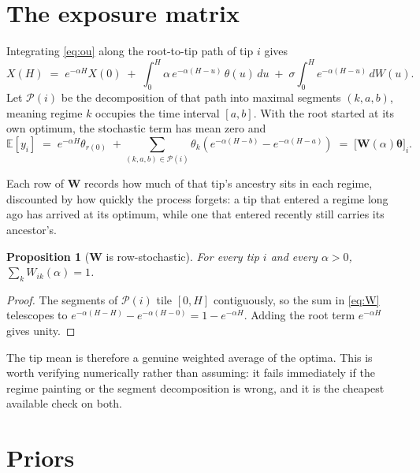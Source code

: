 \documentclass[11pt]{article}
\newtheorem{proposition}{Proposition}
\newcommand{\Wm}{\mathbf{W}}
\newcommand{\thetav}{\boldsymbol{\theta}}
\newcommand{\E}{\mathbb{E}}
\begin{document}
\section{The exposure matrix}

Integrating \eqref{eq:ou} along the root-to-tip path of tip $i$ gives
\begin{equation}
X(H) \;=\; e^{-\alpha H} X(0) \;+\; \int_{0}^{H}\!\alpha\, e^{-\alpha(H-u)}\,\theta(u)\,du
   \;+\; \sigma\!\int_{0}^{H}\! e^{-\alpha(H-u)}\,dW(u).
\end{equation}
Let $\mathcal{P}(i)$ be the decomposition of that path into maximal segments $(k, a, b)$, meaning
regime $k$ occupies the time interval $[a,b]$. With the root started at its own optimum, the
stochastic term has mean zero and
\begin{equation}
\E[y_i] \;=\; e^{-\alpha H}\theta_{r(0)}
   \;+\!\! \sum_{(k,a,b) \in \mathcal{P}(i)}\!\! \theta_{k}\left(e^{-\alpha(H-b)} - e^{-\alpha(H-a)}\right)
   \;=\; \bigl[\Wm(\alpha)\thetav\bigr]_{i}.
\label{eq:W}
\end{equation}

Each row of $\Wm$ records how much of that tip's ancestry sits in each regime, discounted by how
quickly the process forgets: a tip that entered a regime long ago has arrived at its optimum, while
one that entered recently still carries its ancestor's.

\begin{proposition}[$\Wm$ is row-stochastic]
For every tip $i$ and every $\alpha > 0$, $\sum_{k} W_{ik}(\alpha) = 1$.
\end{proposition}
\begin{proof}
The segments of $\mathcal{P}(i)$ tile $[0,H]$ contiguously, so the sum in \eqref{eq:W} telescopes to
$e^{-\alpha(H-H)} - e^{-\alpha(H-0)} = 1 - e^{-\alpha H}$. Adding the root term $e^{-\alpha H}$ gives
unity.
\end{proof}

\noindent
The tip mean is therefore a genuine weighted average of the optima. This is worth verifying
numerically rather than assuming: it fails immediately if the regime painting or the segment
decomposition is wrong, and it is the cheapest available check on both.

\section{Priors}
\end{document}
